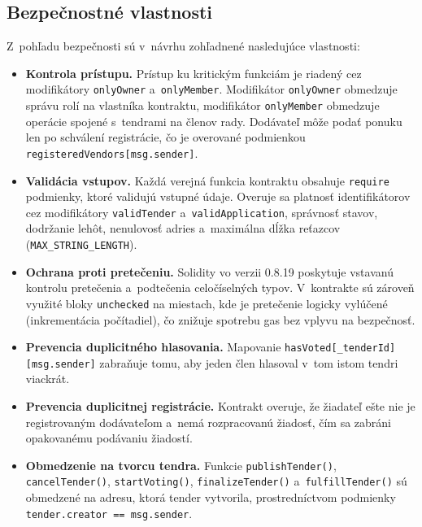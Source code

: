 \subsection{Bezpečnostné vlastnosti}
\label{subsec:security_properties}

Z~pohľadu bezpečnosti sú v~návrhu zohľadnené nasledujúce vlastnosti:

\begin{itemize}
    \item \textbf{Kontrola prístupu.} Prístup ku kritickým funkciám je
    riadený cez modifikátory \texttt{onlyOwner} a~\texttt{onlyMember}.
    Modifikátor \texttt{onlyOwner} obmedzuje správu rolí na vlastníka
    kontraktu, modifikátor \texttt{onlyMember} obmedzuje operácie
    spojené s~tendrami na členov rady. Dodávateľ môže podať ponuku
    len po schválení registrácie, čo je overované podmienkou
    \texttt{registeredVendors[msg.sender]}.

    \item \textbf{Validácia vstupov.} Každá verejná funkcia kontraktu
    obsahuje \texttt{require} podmienky, ktoré validujú vstupné údaje.
    Overuje sa platnosť identifikátorov cez modifikátory
    \texttt{validTender} a~\texttt{validApplication}, správnosť stavov,
    dodržanie lehôt, nenulovosť adries a~maximálna dĺžka reťazcov
    (\texttt{MAX\_STRING\_LENGTH}).

    \item \textbf{Ochrana proti pretečeniu.} Solidity vo verzii 0.8.19
    poskytuje vstavanú kontrolu pretečenia a~podtečenia celočíselných
    typov. V~kontrakte sú zároveň využité bloky \texttt{unchecked} na
    miestach, kde je pretečenie logicky vylúčené (inkrementácia
    počítadiel), čo znižuje spotrebu gas bez vplyvu na bezpečnosť.

    \item \textbf{Prevencia duplicitného hlasovania.} Mapovanie
    \texttt{hasVoted[\_tenderId][msg.sender]} zabraňuje tomu, aby
    jeden člen hlasoval v~tom istom tendri viackrát.

    \item \textbf{Prevencia duplicitnej registrácie.} Kontrakt overuje,
    že žiadateľ ešte nie je registrovaným dodávateľom a~nemá
    rozpracovanú žiadosť, čím sa zabráni opakovanému podávaniu
    žiadostí.

    \item \textbf{Obmedzenie na tvorcu tendra.} Funkcie
    \texttt{publishTender()}, \texttt{cancelTender()},
    \texttt{startVoting()}, \texttt{finalizeTender()} a~\texttt{fulfillTender()}
    sú obmedzené na adresu, ktorá tender vytvorila, prostredníctvom
    podmienky \texttt{tender.creator == msg.sender}.
\end{itemize}

